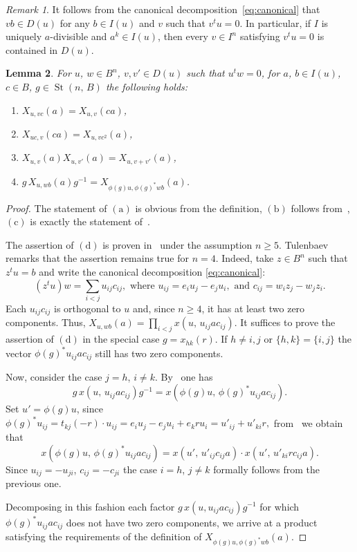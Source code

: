 \documentclass[11pt]{amsart}
\theoremstyle{plain} \declaretheorem[name=Theorem, Refname={Theorem,Theorems}]{tm} \Crefname{tm}{Theorem}{Theorems}
\numberwithin{equation}{section}
\newtheorem{lm}{Lemma} \numberwithin{lm}{section} \Crefname{lm}{Lemma}{Lemmas}
\theoremstyle{definition} \newtheorem{df}[lm]{Definition} \Crefname{df}{Definition}{Definitions}
\theoremstyle{remark} \newtheorem{rk}[lm]{Remark} \Crefname{rk}{Remark}{Remarks}
\newcommand{\St}{\mathop{\mathrm{St}}\nolimits}
\newcommand{\inv}{^{-1}}
\begin{document}
\begin{rk} \label{rk:ID}
It follows from the canonical decomposition~\eqref{eq:canonical} that $vb\in D(u)$ for any $b\in I(u)$ and $v$ such that $v^tu=0$.
In particular, if $I$ is uniquely $a$-divisible and $a^k\in I(u)$, then every $v\in I^n$ satisfying $v^tu=0$ is contained in $D(u)$.
\end{rk}

\begin{lm} \label{xproperties}
For $u$, $w\in B^n$, $v, v' \in D(u)$ such that $u^tw=0$, for $a$, $b\in I(u)$, $c\in B$, $g\in\St(n,\,B)$ the following holds:
\begin{enumerate}
\item $X_{u,vc}(a)=X_{u,v}(ca)$,
\item $X_{uc,v}(ca)=X_{u,vc^2}(a)$,
\item $X_{u,v}(a)X_{u,v'}(a)=X_{u,v+v'}(a)$,
\item $g\,X_{u,wb}(a)g\inv=X_{\phi(g)u,\phi(g)^*wb}(a)$.
\end{enumerate}
\end{lm}

\begin{proof}
The statement of $(\mathrm a)$ is obvious from the definition, $(\mathrm b)$ follows from~\cite[Lemma~1.1\,d)]{Tul}, $(\mathrm c)$ is exactly the statement of~\cite[Lemma~1.3\,a)]{Tul}.

The assertion of $(\mathrm d)$ is proven in~\cite[Lemma~1.3\,b)]{Tul} under the assumption $n\geq5$. 
Tulenbaev remarks that the assertion remains true for $n=4$. %
Indeed, take $z\in B^n$ such that $z^tu=b$ and write the canonical decomposition \eqref{eq:canonical}:
$$(z^tu)w=\sum_{i<j}u_{ij} c_{ij}, \text{ where } u_{ij}=e_iu_j-e_ju_i,\text{ and }c_{ij}=w_iz_j-w_jz_i.$$
Each $u_{ij} c_{ij}$ is orthogonal to $u$ and, since $n\geq4$, it has at least two zero components.
Thus, $X_{u,wb}(a)=\prod_{i<j}x(u,\, u_{ij} ac_{ij})$. 
It suffices to prove the assertion of $(\mathrm d)$ in the special case $g=x_{hk}(r)$.
If $h\neq i,j$ or $\{h,k\}=\{i,j\}$ the vector $\phi(g)^*u_{ij}ac_{ij}$ still has two zero components.

Now, consider the case $j=h$, $i\neq k$.
By~\cite[3.12]{vdK} one has $$g\,x(u,\,u_{ij}ac_{ij})g\inv=x(\phi(g)u,\,\phi(g)^*u_{ij}ac_{ij}).$$
Set $u' = \phi(g)u$, since
$\phi(g)^*u_{ij} = t_{kj}(-r) \cdot u_{ij} = e_iu_j - e_ju_i + e_kru_i =u'_{ij}+u'_{ki}r,$ 
from~\cite[3.11]{vdK} we obtain that
$$x(\phi(g)u,\,\phi(g)^* u_{ij} ac_{ij})=x\left(u',\,u'_{ij}c_{ij}a\right)\cdot x\left(u',\,u'_{ki} rc_{ij}a\right).$$
Since $u_{ij} = - u_{ji}$, $c_{ij}= - c_{ji}$ the case $i=h$, $j\neq k$ formally follows from the previous one.

Decomposing in this fashion each factor $g\,x(u,u_{ij}ac_{ij})g^{-1}$ for which $\phi(g)^*u_{ij}ac_{ij}$ does not have two zero components, 
 we arrive at a product satisfying the requirements of the definition of $X_{\phi(g)u,\phi(g)^*wb}(a)$.
 \end{proof}
\end{document}
